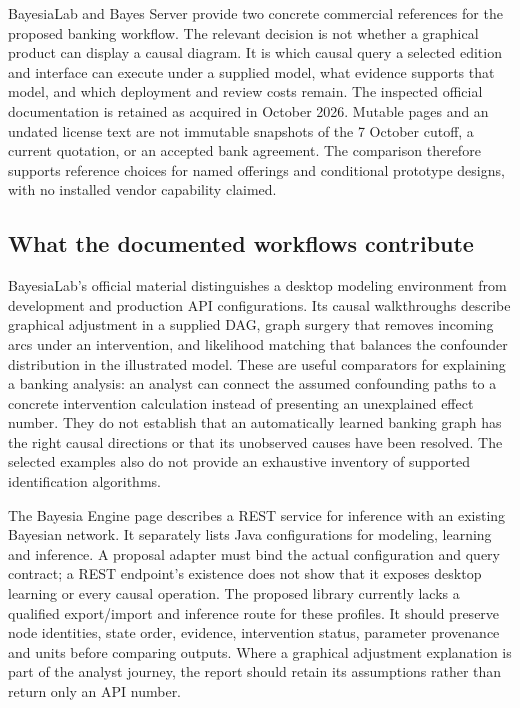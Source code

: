 BayesiaLab and Bayes Server provide two concrete commercial references for
the proposed banking workflow. The relevant decision is not whether a
graphical product can display a causal diagram. It is which causal query a
selected edition and interface can execute under a supplied model, what
evidence supports that model, and which deployment and review costs remain.
The inspected official documentation is retained as acquired in October
2026. Mutable pages and an undated license text are not immutable snapshots
of the 7 October cutoff, a current quotation, or an accepted bank agreement.
The comparison therefore supports reference choices for named offerings and
conditional prototype designs, with no installed vendor capability claimed.
\citep{exec13_bayesia_api,exec13_bayesia_professional,exec14_ci_release_history,exec14_ci_eula}

\subsection{What the documented workflows contribute}

BayesiaLab's official material distinguishes a desktop modeling environment
from development and production API configurations. Its causal walkthroughs
describe graphical adjustment in a supplied DAG, graph surgery that removes
incoming arcs under an intervention, and likelihood matching that balances
the confounder distribution in the illustrated model. These are useful
comparators for explaining a banking analysis: an analyst can connect the
assumed confounding paths to a concrete intervention calculation instead of
presenting an unexplained effect number. They do not establish that an
automatically learned banking graph has the right causal directions or that
its unobserved causes have been resolved. The selected examples also do not
provide an exhaustive inventory of supported identification algorithms.
\citep{exec13_ci_bayesia_criteria,exec13_ci_bayesia_surgery,exec13_ci_bayesia_matching}

The Bayesia Engine page describes a REST service for inference with an
existing Bayesian network. It separately lists Java configurations for
modeling, learning and inference. A proposal adapter must bind the actual
configuration and query contract; a REST endpoint's existence does not show
that it exposes desktop learning or every causal operation. The proposed
library currently lacks a qualified export/import and inference route for
these profiles. It should preserve node identities, state order, evidence,
intervention status, parameter provenance and units before comparing outputs.
Where a graphical adjustment explanation is part of the analyst journey,
the report should retain its assumptions rather than return only an API
number.~\citep{exec13_bayesia_api,exec13_ci_bayesia_surgery}

